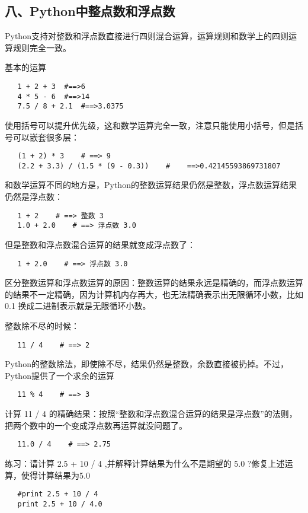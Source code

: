 \documentclass{article}
\begin{document}
\begin{CJK}{UTF8}{gbsn}
\part*{八、Python中整点数和浮点数}
\subparagraph*{}
Python支持对整数和浮点数直接进行四则混合运算，运算规则和数学上的四则运算规则完全一致。
\subparagraph*{}
基本的运算
\begin{verbatim}
   1 + 2 + 3  #==>6
   4 * 5 - 6  #==>14
   7.5 / 8 + 2.1  #==>3.0375
\end{verbatim}
\subparagraph*{}
使用括号可以提升优先级，这和数学运算完全一致，注意只能使用小括号，但是括号可以嵌套很多层：
\begin{verbatim}
   (1 + 2) * 3    # ==> 9
   (2.2 + 3.3) / (1.5 * (9 - 0.3))    #    ==>0.42145593869731807
\end{verbatim}
\subparagraph*{}
和数学运算不同的地方是，Python的整数运算结果仍然是整数，浮点数运算结果仍然是浮点数：
\begin{verbatim}
   1 + 2    # ==> 整数 3
   1.0 + 2.0    # ==> 浮点数 3.0
\end{verbatim}
\subparagraph*{}
但是整数和浮点数混合运算的结果就变成浮点数了：
\begin{verbatim}
   1 + 2.0    # ==> 浮点数 3.0
\end{verbatim}
\subparagraph*{}
区分整数运算和浮点数运算的原因：整数运算的结果永远是精确的，而浮点数运算的结果不一定精确，因为计算机内存再大，也无法精确表示出无限循环小数，比如 0.1 换成二进制表示就是无限循环小数。
\subparagraph*{}
整数除不尽的时候：
\begin{verbatim}
   11 / 4    # ==> 2
\end{verbatim}
\subparagraph*{}
Python的整数除法，即使除不尽，结果仍然是整数，余数直接被扔掉。不过，Python提供了一个求余的运算 %
\begin{verbatim}
   11 % 4    # ==> 3
\end{verbatim}
\subparagraph*{}
计算 11 / 4 的精确结果：按照“整数和浮点数混合运算的结果是浮点数”的法则，把两个数中的一个变成浮点数再运算就没问题了。
\begin{verbatim}
   11.0 / 4    # ==> 2.75
\end{verbatim}
\subparagraph*{}
练习：请计算 2.5 + 10 / 4 ,并解释计算结果为什么不是期望的 5.0 ?修复上述运算，使得计算结果为5.0
\begin{verbatim}
   #print 2.5 + 10 / 4
   print 2.5 + 10 / 4.0
\end{verbatim}

\end{CJK}
\end{document}
